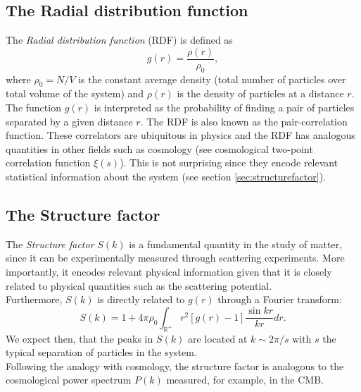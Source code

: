 \documentclass[%
aps,
pra,%
amsmath,amssymb,
preprint,%
reprint,%
notitlepage,
a4paper]{revtex4-1}
\begin{document}
\subsection{The Radial distribution function}
The \textit{Radial distribution function} (RDF) is defined as
\begin{equation}
g(r) = \frac{\rho(r)}{\rho_0},
\end{equation}
where $\rho_0 = N/V$ is the constant average density (total number of particles over total volume of the system) and $\rho(r)$ is the density of particles at a distance $r$. The function $g(r)$ is interpreted as the probability of finding a pair of particles separated by a given distance $r$. The RDF is also known as the pair-correlation function. These correlators are ubiquitous in physics and the RDF has analogous quantities in other fields such as cosmology (see cosmological two-point correlation function $\xi(s)$\cite{Peebles1980}). This is not surprising since they encode relevant statistical information about the system (see section \ref{sec:structurefactor}).\\
\subsection{The Structure factor \label{sec:structurefactor}}
The \textit{Structure factor} $S(k)$ is a fundamental quantity in the study of matter, since it can be experimentally measured through scattering experiments\cite{Simon2013}. More importantly, it encodes relevant physical information given that it is closely related to physical quantities such as the scattering potential.\\
Furthermore, $S(k)$ is directly related to $g(r)$ through a Fourier transform:
\begin{equation}
S(k) = 1 + 4\pi\rho_0\int_{\mathbb{R}^+}r^2 [g(r) - 1] \frac{\sin kr}{kr} dr.
\label{eq:sofk}
\end{equation}
We expect then, that the peaks in $S(k)$ are located at $k\sim 2\pi/s$ with $s$ the typical separation of particles in the system.\\
Following the analogy with cosmology, the structure factor is analogous to the cosmological power spectrum $P(k)$ measured, for example, in the CMB\cite{Peebles1980}.
\end{document}
